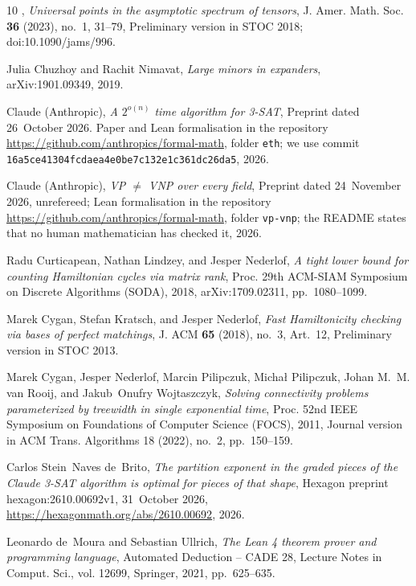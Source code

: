 \documentclass[10pt]{amsart}
\theoremstyle{plain}
\theoremstyle{definition}
\theoremstyle{remark}
\numberwithin{equation}{section}
\begin{document}
\begin{thebibliography}{10}
\bysame, \emph{Universal points in the asymptotic spectrum of tensors}, J.
  Amer. Math. Soc. \textbf{36} (2023), no.~1, 31--79, Preliminary version in
  STOC 2018; doi:10.1090/jams/996.

Julia Chuzhoy and Rachit Nimavat, \emph{Large minors in expanders},
  arXiv:1901.09349, 2019.

{Claude (Anthropic)}, \emph{A $2^{o(n)}$ time algorithm for {3-SAT}}, Preprint
  dated 26~October 2026. Paper and Lean formalisation in the repository
  \url{https://github.com/anthropics/formal-math}, folder \texttt{eth}; we use
  commit \texttt{16a5ce41304fcdaea4e0be7c132e1c361dc26da5}, 2026.

{Claude (Anthropic)}, \emph{{VP} $\ne$ {VNP} over every field}, Preprint dated
  24~November 2026, unrefereed; Lean formalisation in the repository
  \url{https://github.com/anthropics/formal-math}, folder \texttt{vp-vnp}; the
  README states that no human mathematician has checked it, 2026.

Radu Curticapean, Nathan Lindzey, and Jesper Nederlof, \emph{A tight lower
  bound for counting {H}amiltonian cycles via matrix rank}, Proc. 29th ACM-SIAM
  Symposium on Discrete Algorithms (SODA), 2018, arXiv:1709.02311,
  pp.~1080--1099.

Marek Cygan, Stefan Kratsch, and Jesper Nederlof, \emph{Fast {H}amiltonicity
  checking via bases of perfect matchings}, J. ACM \textbf{65} (2018), no.~3,
  Art.~12, Preliminary version in STOC 2013.

Marek Cygan, Jesper Nederlof, Marcin Pilipczuk, Micha{\l} Pilipczuk, Johan
  M.~M. van Rooij, and Jakub~Onufry Wojtaszczyk, \emph{Solving connectivity
  problems parameterized by treewidth in single exponential time}, Proc. 52nd
  IEEE Symposium on Foundations of Computer Science (FOCS), 2011, Journal
  version in ACM Trans. Algorithms 18 (2022), no.~2, pp.~150--159.

Carlos Stein~Naves de~Brito, \emph{The partition exponent in the graded pieces
  of the {C}laude {3-SAT} algorithm is optimal for pieces of that shape},
  Hexagon preprint hexagon:2610.00692v1, 31~October 2026,
  \url{https://hexagonmath.org/abs/2610.00692}, 2026.

Leonardo de~Moura and Sebastian Ullrich, \emph{The {L}ean 4 theorem prover and
  programming language}, Automated Deduction -- CADE 28, Lecture Notes in
  Comput. Sci., vol. 12699, Springer, 2021, pp.~625--635.


\end{thebibliography}
\end{document}
